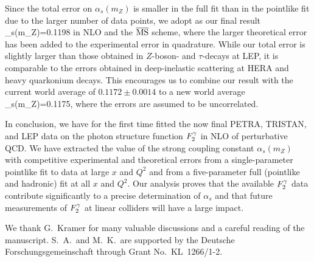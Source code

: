 \documentclass[aps,prl,twocolumn,groupedaddress]{revtex4}
\begin{document}
Since the total error on $\alpha_s(m_Z)$ is smaller in the full fit than in
the pointlike fit due to the larger number of data points, we adopt as our
final result
\pagebreak
\beq
 \alpha_s(m_Z)=0.1198
\eeq
in NLO and the $\overline{\rm MS}$ scheme, where the larger theoretical error has been added
to the experimental error in quadrature. While our total error is
slightly larger than those obtained in $Z$-boson- and
$\tau$-decays at LEP, it is comparable to the errors obtained in deep-inelastic
scattering at HERA and heavy quarkonium decays. This encourages us to
combine our result with the current world average of $0.1172\pm0.0014$
\cite{Groom:2000in} to a new world average
\beq
 \alpha_s(m_Z)=0.1175,
\eeq
where the errors are assumed to be uncorrelated.

In conclusion, we have for the first time fitted the now final PETRA,
TRISTAN, and LEP data on the photon structure function $\f2y$ in NLO of
perturbative QCD. We have extracted the value of the strong coupling constant
$\alpha_s(m_Z)$ with competitive experimental and theoretical errors from a
single-parameter pointlike fit to data at large $x$ and $Q^2$ and from a
five-parameter full (pointlike and hadronic) fit at all $x$ and $Q^2$.
Our analysis proves that the available $\f2y$ data contribute significantly
to a precise determination of $\alpha_s$ and that future measurements of
$\f2y$ at linear colliders will have a large impact.


\begin{acknowledgments}

We thank G.\ Kramer for many valuable discussions and a careful reading of the
manuscript. S.\ A.\ and M.\ K.\ are supported by the Deutsche
Forschungsgemeinschaft through Grant No.\ KL~1266/1-2. %

\end{acknowledgments}
\end{document}
